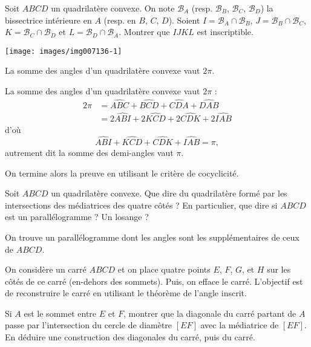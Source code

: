 \begin{exo}%
Soit $ABCD$ un quadrilatère convexe. On note $\mathcal B_A$ (resp. $\mathcal B_B$, $\mathcal B_C$, $\mathcal B_D$) la bissectrice intérieure en $A$ (resp. en $B$, $C$, $D$). Soient $I=\mathcal B_A\cap \mathcal B_B$, $J=\mathcal B_B\cap \mathcal B_C$, $K=\mathcal B_C\cap \mathcal B_D$ et $L=\mathcal B_D\cap \mathcal B_A$. Montrer que $IJKL$ est inscriptible.

\begin{center}
\texttt{[image: images/img007136-1]}
\end{center}


\begin{hint}
La somme des angles d'un quadrilatère convexe vaut $2\pi$.
\end{hint}
\begin{sol}
La somme des angles d'un quadrilatère convexe vaut $2\pi$ :
\begin{align*}
2\pi &=
\widehat{ABC}+\widehat{BCD}+\widehat{CDA}+\widehat{DAB}\\
&= 2\widehat{ABI}
+2\widehat{KCD}+2\widehat{CDK}+2\widehat{IAB}
\end{align*}
d'où \[\widehat{ABI}
+\widehat{KCD}+\widehat{CDK}+\widehat{IAB}=\pi,\]
autrement dit la somme des demi-angles vaut $\pi$.

On termine alors la preuve en utilisant le critère de cocyclicité.

\end{sol}
\end{exo}  


\begin{exo}%
Soit $ABCD$ un quadrilatère convexe. Que dire du quadrilatère formé par les intersections des médiatrices des quatre côtés ? En particulier, que dire si $ABCD$ est un parallélogramme ? Un losange ?


\begin{sol} 
On trouve un parallélogramme dont les angles sont les supplémentaires de ceux de $ABCD$.
\end{sol}  
\end{exo}  


\begin{exo}
On considère un carré $ABCD$ et on place quatre points $E$, $F$, $G$, et $H$ sur les côtés de ce carré (en-dehors des sommets). Puis, on efface le carré. L'objectif est de reconstruire le carré en utilisant le théorème de l'angle inscrit.

Si $A$ est le sommet entre $E$ et $F$, montrer que la diagonale du carré partant de $A$ passe par l'intersection du cercle de diamètre $[EF]$ avec la médiatrice de $[EF]$. %
En déduire une construction des diagonales du carré, puis du carré.


\end{exo}  



